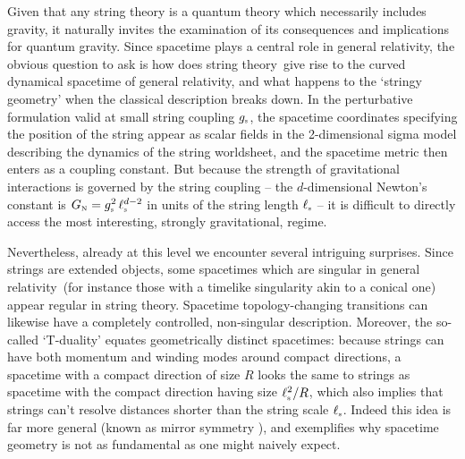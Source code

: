\documentclass[12pt]{article}
\def\GR{general relativity}
\def\STY{string theory}
\def\QG{quantum gravity}
\def\gst{g_{\scriptscriptstyle {\rm s}}}
\def\GN{G_{\scriptscriptstyle {\rm N}}}
\def\lst{\ell_{\scriptscriptstyle {\rm s}}}
\begin{document}
Given that any string theory is a quantum theory which necessarily includes gravity, it naturally invites the examination of its consequences and implications for \QG.  Since spacetime plays a central role in \GR, the obvious question to ask is how does \STY\ give rise to the curved dynamical spacetime of \GR,  and what happens to the `stringy geometry' when the classical description breaks down.  
In the perturbative formulation valid at small string coupling $\gst$, 
 the spacetime coordinates specifying the position of the string appear as scalar fields in the 2-dimensional sigma model describing the dynamics of the string worldsheet, and
the spacetime metric then enters as a coupling constant.
But because the strength of gravitational interactions is governed by the string coupling -- the $d$-dimensional Newton's constant is $\GN = \gst^2 \, \lst^{d-2}$  in units of the string length $\lst$ --  it is difficult to directly access the most interesting, strongly gravitational, regime.  

Nevertheless, already at this level we encounter several intriguing surprises.  Since strings are extended objects, some spacetimes which are singular in \GR\ (for instance those with a timelike singularity akin to a conical one) appear regular in \STY.  Spacetime topology-changing transitions can likewise have a completely controlled, non-singular description.  Moreover, the so-called `T-duality' equates geometrically distinct spacetimes: because strings can have both momentum and winding modes around compact directions, a spacetime with a compact direction of size $R$ looks the same to strings as spacetime with the compact direction having size $\lst^2 / R$, which also implies that strings can't resolve distances shorter than the string scale $\lst$.  Indeed this idea is far more general  (known as mirror symmetry \cite{Greene:1991iv}), and exemplifies why spacetime geometry is not as fundamental as one might naively expect.
\end{document}
